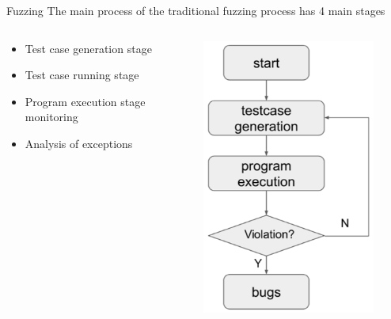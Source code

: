 \documentclass[11pt,t]{beamer}
\begin{document}
\begin{frame}[fragile]{Fuzzing} 
The main process of the traditional fuzzing process has 4 main stages
\begin{columns}[t]
	\begin{column}{.5\textwidth}
		\begin{itemize}
			\item Test case generation stage
			\item Test case running stage
			\item Program execution stage monitoring
			\item Analysis of exceptions
			\end{itemize}	
	\end{column}

	\begin{column}{.5\textwidth}
		\begin{figure}[tbh]
			\centering
			\includegraphics[width=0.6\linewidth]{graphics/fuzzing/fuzz_stages.png}
			\label{fig:fuzz_stages}
		  \end{figure}
	\end{column}
\end{columns}	

\sed
\end{frame}
\end{document}
